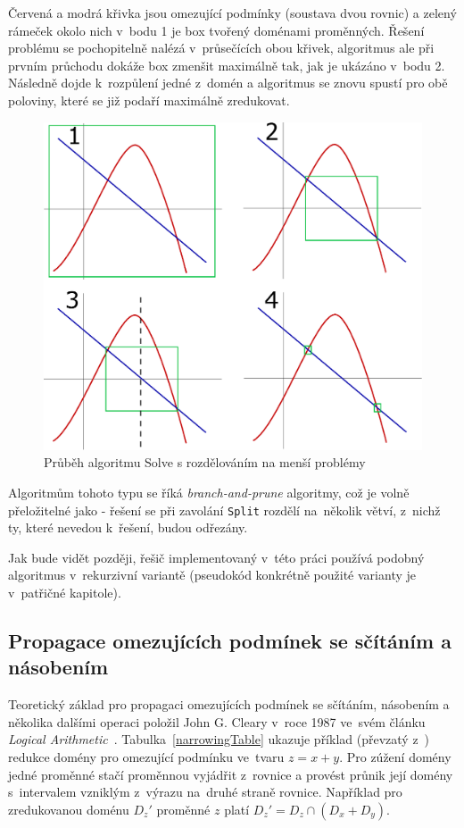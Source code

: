 Červená a modrá křivka jsou omezující podmínky (soustava dvou rovnic) a zelený rámeček okolo nich v~bodu 1 je box tvořený doménami proměnných. Řešení problému se pochopitelně nalézá v~průsečících obou křivek, algoritmus ale při prvním průchodu dokáže box zmenšit maximálně tak, jak je ukázáno v~bodu 2. Následně dojde k~rozpůlení jedné z~domén a algoritmus se znovu spustí pro obě poloviny, které se již podaří maximálně zredukovat.

\begin{figure}
\centering
\includegraphics[scale=.68]{img/solving.eps}
\caption{Průběh algoritmu Solve s rozdělováním na menší problémy}
\label{img:solving}
\end{figure}

Algoritmům tohoto typu se říká \emph{branch-and-prune} algoritmy, což je volně přeložitelné jako  - řešení se při zavolání \verb|Split| rozdělí na~několik větví, z~nichž ty, které nevedou k~řešení, budou odřezány.

Jak bude vidět později, řešič implementovaný v~této práci používá podobný algoritmus v~rekurzivní variantě (pseudokód konkrétně použité varianty je v~patřičné kapitole).







\subsection{Propagace omezujících podmínek se sčítáním a násobením}
\label{ch:narrowingHowWorks}
Teoretický základ pro propagaci omezujících podmínek se sčítáním, násobením a několika dalšími operaci položil John G. Cleary v~roce 1987 ve~svém článku \emph{Logical Arithmetic}~\cite{cleary87}. Tabulka~\ref{narrowingTable} ukazuje příklad (převzatý z~\cite{cleary87}) redukce domény pro omezující podmínku ve~tvaru $z = x + y$. Pro zúžení domény jedné proměnné stačí proměnnou vyjádřit z~rovnice a provést průnik její domény s~intervalem vzniklým z~výrazu na~druhé straně rovnice. Například pro zredukovanou doménu $D_z'$ proměnné $z$ platí $D_z' = D_z \cap (D_x + D_y)$.




